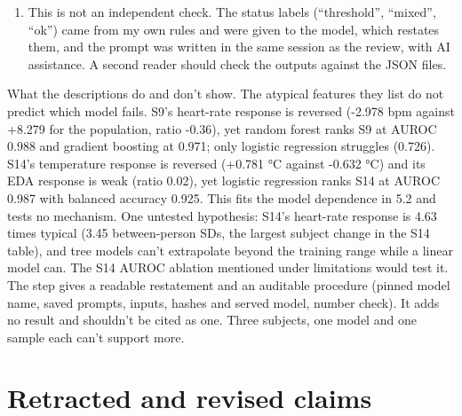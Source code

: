 \documentclass[11pt]{article}
\begin{document}
\begin{enumerate}
  wording in 5.5. Both were wrong or unsupported. The HRV proxy's
  population change is 1.15 SDs and S14's is -1.87 SDs, a large opposite
  change in a feature already known to be unreliable. S5's movement
  change is -0.61 SDs against a population change of +0.28, so S5's
  movement went down while the group's went up. An earlier draft of 5.5
  said S5 ``barely moved'', which was wrong, and I corrected it.
\item
  This is not an independent check. The status labels (``threshold'',
  ``mixed'', ``ok'') came from my own rules and were given to the model,
  which restates them, and the prompt was written in the same session as
  the review, with AI assistance. A second reader should check the
  outputs against the JSON files.
\end{enumerate}

What the descriptions do and don't show. The atypical features they list
do not predict which model fails. S9's heart-rate response is reversed
(-2.978 bpm against +8.279 for the population, ratio -0.36), yet random
forest ranks S9 at AUROC 0.988 and gradient boosting at 0.971; only
logistic regression struggles (0.726). S14's temperature response is
reversed (+0.781 °C against -0.632 °C) and its EDA response is weak
(ratio 0.02), yet logistic regression ranks S14 at AUROC 0.987 with
balanced accuracy 0.925. This fits the model dependence in 5.2 and tests
no mechanism. One untested hypothesis: S14's heart-rate response is 4.63
times typical (3.45 between-person SDs, the largest subject change in
the S14 table), and tree models can't extrapolate beyond the training
range while a linear model can. The S14 AUROC ablation mentioned under
limitations would test it. The step gives a readable restatement and an
auditable procedure (pinned model name, saved prompts, inputs, hashes
and served model, number check). It adds no result and shouldn't be
cited as one. Three subjects, one model and one sample each can't
support more.

\hypertarget{retracted-and-revised-claims}{%
\section{Retracted and revised
claims}\label{retracted-and-revised-claims}}
\end{document}
